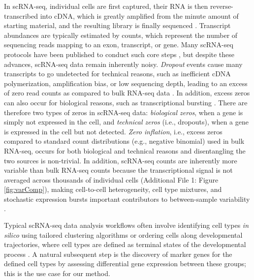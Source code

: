 \documentclass{bmcart}
\begin{document}
In scRNA-seq, individual cells are first captured, their RNA is then reverse-transcribed into cDNA, which is greatly amplified from the minute amount of starting material, and the resulting library is finally sequenced \citep{Kolodziejczyk2015a}. Transcript abundances are typically estimated by counts, which represent the number of sequencing reads mapping to an exon, transcript, or gene. Many scRNA-seq protocols have been published to conduct such core steps \citep{Nakamura2015, Wu2013a, Islam2013, Islam2011, Picelli2014, Hashimshony2016a}, but despite these advances, scRNA-seq data remain inherently noisy. \textit{Dropout} events cause many transcripts to go undetected for technical reasons, such as inefficient cDNA polymerization, amplification bias, or low sequencing depth, leading to an excess of zero read counts as compared to bulk RNA-seq data \citep{Hashimshony2016a, Finak2015}. In addition, excess zeros can also occur for biological reasons, such as transcriptional bursting \citep{Raj2008}. 
There are therefore two types of zeros in scRNA-seq data: \textit{biological zeros}, when a gene is simply not expressed in the cell, and \textit{technical zeros} (i.e., dropouts), when a gene is expressed in the cell but not detected. \textit{Zero inflation}, i.e., excess zeros compared to standard count distributions (e.g., negative binomial) used in bulk RNA-seq, occurs for both biological and technical reasons and disentangling the two sources is non-trivial. In addition, scRNA-seq counts are inherently more variable than bulk RNA-seq counts because the transcriptional signal is not averaged across thousands of individual cells (Additional File 1: Figure \ref{fig:varComp}), making cell-to-cell heterogeneity, cell type mixtures, and stochastic expression bursts important contributors to between-sample variability \citep{Raj2006, Buettner2015}.

Typical scRNA-seq data analysis workflows often involve identifying cell types \textit{in silico} using tailored clustering algorithms \citep{Pierson2015, Risso2017} or ordering cells along developmental trajectories, where cell types are defined as terminal states of the developmental process \citep{Setty2016, Qiu2017, Lonnberg2017, Street2017}. A natural subsequent step is the discovery of marker genes for the defined cell types by assessing differential gene expression between these groups; this is the use case for our method.
\end{document}
